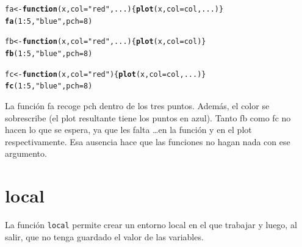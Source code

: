 \documentclass{config/apuntes}\usepackage[]{graphicx}\usepackage[]{xcolor}
\makeatletter
\newcommand{\hlnum}[1]{\textcolor[rgb]{0.686,0.059,0.569}{#1}}%
\newcommand{\hlsng}[1]{\textcolor[rgb]{0.192,0.494,0.8}{#1}}%
\newcommand{\hlopt}[1]{\textcolor[rgb]{0,0,0}{#1}}%
\newcommand{\hldef}[1]{\textcolor[rgb]{0.345,0.345,0.345}{#1}}%
\newcommand{\hlkwa}[1]{\textcolor[rgb]{0.161,0.373,0.58}{\textbf{#1}}}%
\newcommand{\hlkwb}[1]{\textcolor[rgb]{0.69,0.353,0.396}{#1}}%
\newcommand{\hlkwc}[1]{\textcolor[rgb]{0.333,0.667,0.333}{#1}}%
\newcommand{\hlkwd}[1]{\textcolor[rgb]{0.737,0.353,0.396}{\textbf{#1}}}%
\newenvironment{kframe}{%
 \def\at@end@of@kframe{}%
 \ifinner\ifhmode%
  \def\at@end@of@kframe{\end{minipage}}%
  \begin{minipage}{\columnwidth}%
 \fi\fi%
 \def\FrameCommand##1{\hskip\@totalleftmargin \hskip-\fboxsep
 \colorbox{shadecolor}{##1}\hskip-\fboxsep
     \hskip-\linewidth \hskip-\@totalleftmargin \hskip\columnwidth}%
 \MakeFramed {\advance\hsize-\width
   \@totalleftmargin\z@ \linewidth\hsize
   \@setminipage}}%
 {\par\unskip\endMakeFramed%
 \at@end@of@kframe}
\newenvironment{knitrout}{}{} %
\newcommand{\code}[1]{\texttt{#1}}
\makeatother
\begin{document}
\begin{knitrout}
\color{fgcolor}\begin{kframe}
\begin{alltt}
\hldef{fa} \hlkwb{<-} \hlkwa{function}\hldef{(}\hlkwc{x}\hldef{,} \hlkwc{col} \hldef{=} \hlsng{"red"}\hldef{,} \hlkwc{...}\hldef{) \{}\hlkwd{plot}\hldef{(x,} \hlkwc{col} \hldef{= col, ...)\}}
\hlkwd{fa}\hldef{(}\hlnum{1}\hlopt{:}\hlnum{5}\hldef{,} \hlsng{"blue"}\hldef{,} \hlkwc{pch} \hldef{=} \hlnum{8}\hldef{)}

\hldef{fb} \hlkwb{<-} \hlkwa{function}\hldef{(}\hlkwc{x}\hldef{,} \hlkwc{col} \hldef{=} \hlsng{"red"}\hldef{,} \hlkwc{...}\hldef{) \{}\hlkwd{plot}\hldef{(x,} \hlkwc{col} \hldef{= col)\}}
\hlkwd{fb}\hldef{(}\hlnum{1}\hlopt{:}\hlnum{5}\hldef{,} \hlsng{"blue"}\hldef{,} \hlkwc{pch} \hldef{=} \hlnum{8}\hldef{)}

\hldef{fc} \hlkwb{<-} \hlkwa{function}\hldef{(}\hlkwc{x}\hldef{,} \hlkwc{col} \hldef{=} \hlsng{"red"}\hldef{) \{}\hlkwd{plot}\hldef{(x,} \hlkwc{col} \hldef{= col, ...)\}}
\hlkwd{fc}\hldef{(}\hlnum{1}\hlopt{:}\hlnum{5}\hldef{,} \hlsng{"blue"}\hldef{,} \hlkwc{pch} \hldef{=} \hlnum{8}\hldef{)}
\end{alltt}
\end{kframe}
\end{knitrout}
La función fa recoge pch dentro de los tres puntos. Además, el color se sobrescribe (el plot resultante tiene los puntos en azul). Tanto fb como fc no hacen lo que se espera, ya que les falta \ldots en la función y en el plot respectivamente. Esa ausencia hace que las funciones no hagan nada con ese argumento.

\section{local}
La función \code{local} permite crear un entorno local en el que trabajar y luego, al salir, que no tenga guardado el valor de las variables.
\end{document}

